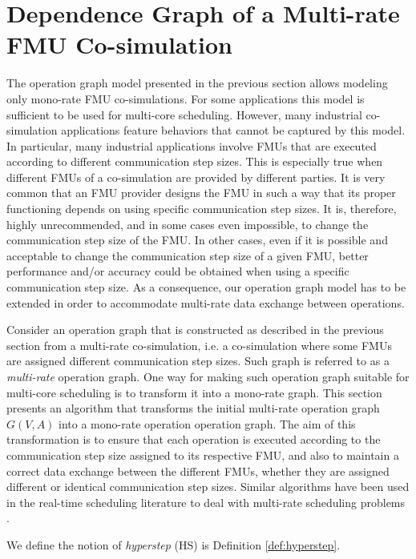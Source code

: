 \section{\label{sec:opgraph}Dependence Graph of a Multi-rate FMU Co-simulation}

The operation graph model presented in the previous section allows modeling only mono-rate FMU co-simulations. For some applications this model is sufficient to be used for multi-core scheduling. However, many industrial co-simulation applications feature behaviors that cannot be captured by this model. In particular, many industrial applications involve FMUs that are executed according to different communication step sizes. This is especially true when different FMUs of a co-simulation are provided by different parties. It is very common that an FMU provider designs the FMU in such a way that its proper functioning depends on using specific communication step sizes. It is, therefore, highly unrecommended, and in some cases even impossible, to change the communication step size of the FMU. In other cases, even if it is possible and acceptable to change the communication step size of a given FMU, better performance and/or accuracy could be obtained when using a specific communication step size. As a consequence, our operation graph model has to be extended in order to accommodate multi-rate data exchange between operations. 

Consider an operation graph that is constructed as described in the previous section from a multi-rate co-simulation, i.e. a co-simulation where some FMUs are assigned different communication step sizes. Such graph is referred to as a \textit{multi-rate} operation graph. One way for making such operation graph suitable for multi-core scheduling is to transform it into a mono-rate graph. This section presents an algorithm that transforms the initial multi-rate operation graph $G(V,A)$ into a mono-rate operation operation graph. %
The aim of this transformation is to ensure that each operation is executed according to the communication step size assigned to its respective FMU, and also to maintain a correct data exchange between the different FMUs, whether they are assigned different or identical communication step sizes. Similar algorithms have been used in the real-time scheduling literature to deal with multi-rate scheduling problems \cite{kermia:2009, ramamritham:1995}.

We define the notion of \textit{hyperstep} (HS) is Definition \ref{def:hyperstep}. 

